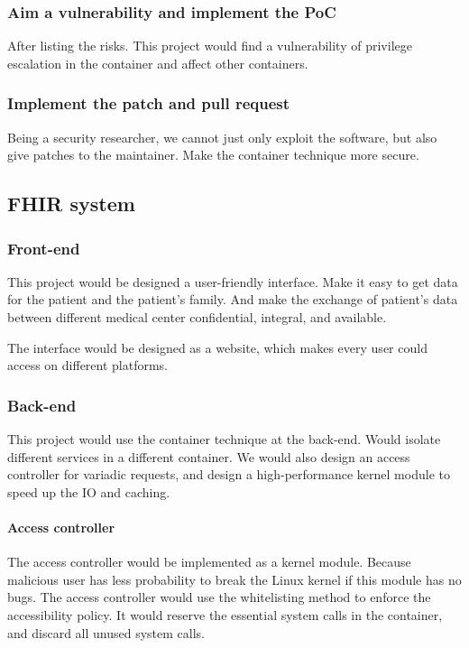 \documentclass[12pt,a4paper]{IEEEconf}
\begin{document}
\subsubsection{Aim a vulnerability and implement the PoC}
After listing the risks. This project would find a vulnerability of privilege escalation in
the container and affect other containers.

\subsubsection{Implement the patch and pull request}
Being a security researcher, we cannot just only exploit the software, but also give patches to
the maintainer. Make the container technique more secure.

\subsection{FHIR system}
\subsubsection{Front-end}
This project would be designed a user-friendly interface. Make it easy to get data for the
patient and the patient's family. And make the exchange of patient's data between different
medical center confidential, integral, and available.

The interface would be designed as a website, which makes every user could access on different
platforms.

\subsubsection{Back-end}
This project would use the container technique at the back-end. Would isolate different services in
a different container. We would also design an access controller for variadic requests, and
design a high-performance kernel module to speed up the IO and caching.

\paragraph{Access controller}
The access controller would be implemented as a kernel module. Because malicious user has less
probability to break the Linux kernel if this module has no bugs.
The access controller would use the whitelisting method to enforce the accessibility policy.
It would reserve the essential system calls in the container, and discard all unused system calls.
\end{document}
